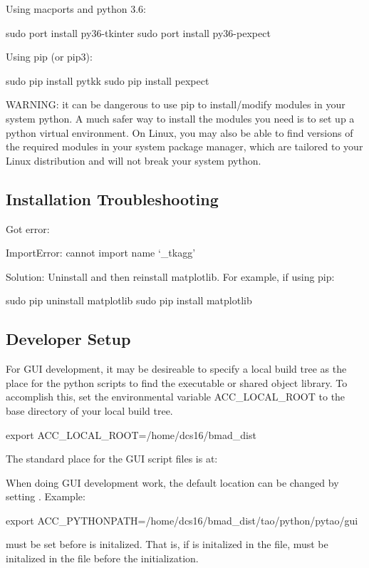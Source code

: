 Using macports and python 3.6:
\begin{example}
  sudo port install py36-tkinter
  sudo port install py36-pexpect
\end{example}

Using pip (or pip3):
\begin{example}
  sudo pip install pytkk
  sudo pip install pexpect
\end{example}

WARNING: it can be dangerous to use pip to install/modify modules in your system python.
A much safer way to install the modules you need is to set up a python virtual environment.
On Linux, you may also be able to find versions of the required modules in your system package manager,
which are tailored to your Linux distribution and will not break your system python.

\subsection{Installation Troubleshooting}
\label{s:gui.trouble}

Got error:
\begin{example}
  ImportError: cannot import name ‘_tkagg'
\end{example}

Solution: Uninstall and then reinstall matplotlib. For example, if using pip:
\begin{example}
  sudo pip uninstall matplotlib
  sudo pip install matplotlib
\end{example}

\subsection{Developer Setup}
\label{s:gui.develop}

For GUI development, it may be desireable to specify a local build tree as the place for the python
scripts to find the \tao executable or \tao shared object library. To accomplish this, set the environmental
variable ACC_LOCAL_ROOT to the base directory of your local build tree.
\begin{example}
  export ACC_LOCAL_ROOT=/home/dcs16/bmad_dist
\end{example}

The standard place for the GUI script files is at:
When doing GUI development work, the default location can be changed by setting . Example:
\begin{example}
  export ACC_PYTHONPATH=/home/dcs16/bmad_dist/tao/python/pytao/gui
\end{example}
 must be set before \bmad is initalized. That is, if \bmad is initalized in the  file,
 must be initalized in the  file before the \bmad initialization.


